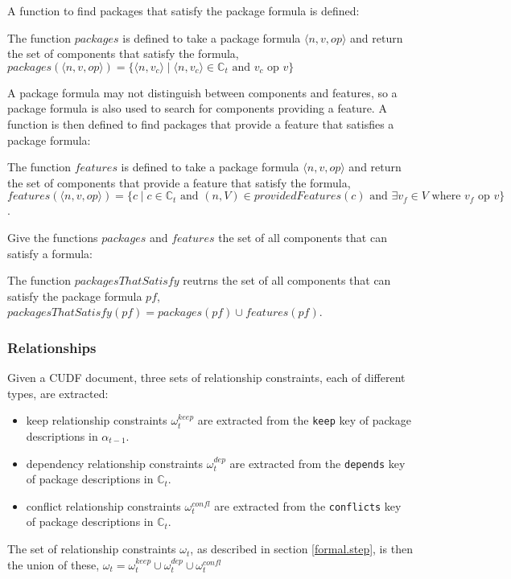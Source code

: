 A function to find packages that satisfy the package formula is defined:
\begin{defs}
The function $packages$ is defined to take a package formula $\langle n,v,op\rangle$ and return the set of components that satisfy the formula,
$packages(\langle n,v,op\rangle) = \{\langle n,v_c \rangle \mid \langle n,v_c \rangle \in \mathbb{C}_t \mbox{ and } v_c \mbox{ op } v\}$
\end{defs}

A package formula may not distinguish between components and features, so a package formula is also used to search for components providing a feature.
A function is then defined to find packages that provide a feature that satisfies a package formula:
\begin{defs}
The function $features$ is defined to take a package formula $\langle n,v,op\rangle$ and return the set of components that provide a feature that satisfy the formula,
$features(\langle n,v,op\rangle) = \{c \mid c \in \mathbb{C}_t \mbox{ and } (n,V) \in providedFeatures(c) \mbox{ and } \exists v_f \in V \mbox { where } v_f \mbox{ op } v \}$.
\end{defs}

Give the functions $packages$ and $features$ the set of all components that can satisfy a formula:
\begin{defs}
The function $packagesThatSatisfy$ reutrns the set of all components that can satisfy the package formula $pf$, $packagesThatSatisfy(pf) = packages(pf) \cup features(pf)$.
\end{defs}

\subsubsection{Relationships}
Given a CUDF document, three sets of relationship constraints, each of different types, are extracted:
\begin{itemize}
  \item keep relationship constraints $\omega_t^{keep}$ are extracted from the \verb+keep+ key of package descriptions in $\alpha_{t-1}$.
  \item dependency relationship constraints $\omega_t^{dep}$ are extracted from the \verb+depends+ key of package descriptions in $\mathbb{C}_t$.
  \item conflict relationship constraints $\omega_t^{confl}$ are extracted from the \verb+conflicts+ key of package descriptions in $\mathbb{C}_t$.
\end{itemize}
The set of relationship constraints $\omega_t$, as described in section \ref{formal.step}, is then the union of these,
$\omega_t =  \omega_t^{keep} \cup \omega_t^{dep} \cup \omega_t^{confl}$


